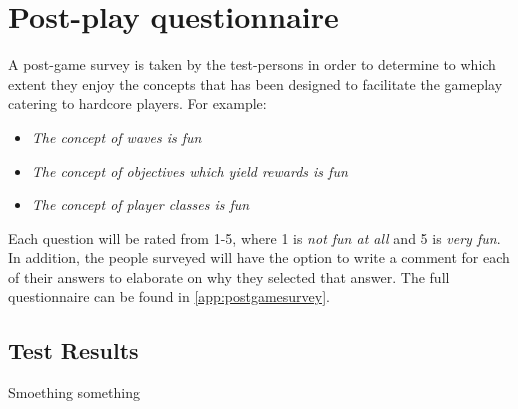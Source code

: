 \section{Post-play questionnaire}
A post-game survey is taken by the test-persons in order to determine to which extent they enjoy the concepts that has been designed to facilitate the gameplay catering to hardcore players.
For example:
\begin{itemize}
\item \emph{The concept of waves is fun}
\item \emph{The concept of objectives which yield rewards is fun}
\item \emph{The concept of player classes is fun}
\end{itemize}

Each question will be rated from 1-5, where 1 is \emph{not fun at all} and 5 is \emph{very fun}.
In addition, the people surveyed will have the option to write a comment for each of their answers to elaborate on why they selected that answer.
The full questionnaire can be found in \ref{app:postgamesurvey}.

\subsection{Test Results}
Smoething something